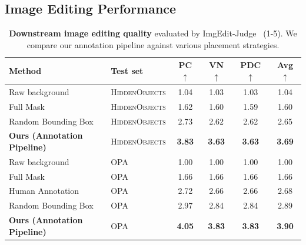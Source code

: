 


\subsection{Image Editing Performance}
\label{sec:4.2}

\begin{table}[!t]
\centering
\caption{\textbf{Downstream image editing quality} evaluated by ImgEdit-Judge~\cite{ye2025imgedit} (1-5). We compare our annotation pipeline against various placement strategies.}
\label{tab:downstream_imgedit}
\begin{small}
\begin{tabular}{@{}llcccc@{}}
\toprule
Method & Test set & PC $\uparrow$ & VN $\uparrow$ & PDC $\uparrow$ & Avg $\uparrow$ \\
\midrule
Raw background & \textsc{HiddenObjects} & 1.04 & 1.03 & 1.03 & 1.04 \\
Full Mask & \textsc{HiddenObjects} & 1.62 & 1.60 & 1.59 & 1.60 \\
Random Bounding Box & \textsc{HiddenObjects} & {2.73} & {2.62} & {2.62} & {2.65} \\
\rowcolor[HTML]{F2F2F2}  \textbf{Ours (Annotation Pipeline)} & \textsc{HiddenObjects} & \textbf{3.83} & \textbf{3.63} & \textbf{3.63} & \textbf{3.69} \\
\midrule
Raw background & \textsc{OPA} & 1.00 & 1.00 & 1.00 & 1.00 \\
Full Mask & \textsc{OPA} & 1.66 & 1.66 & 1.66 & 1.66 \\
Human Annotation & \textsc{OPA} & 2.72 & 2.66 & 2.66 & 2.68 \\
Random Bounding Box & \textsc{OPA} & 2.97 & 2.84 & 2.84 & 2.89 \\
\rowcolor[HTML]{F2F2F2}  \textbf{Ours (Annotation Pipeline)} & \textsc{OPA} & \textbf{4.05} & \textbf{3.83} & \textbf{3.83} & \textbf{3.90} \\
\bottomrule
\end{tabular}
\end{small}
\end{table}

